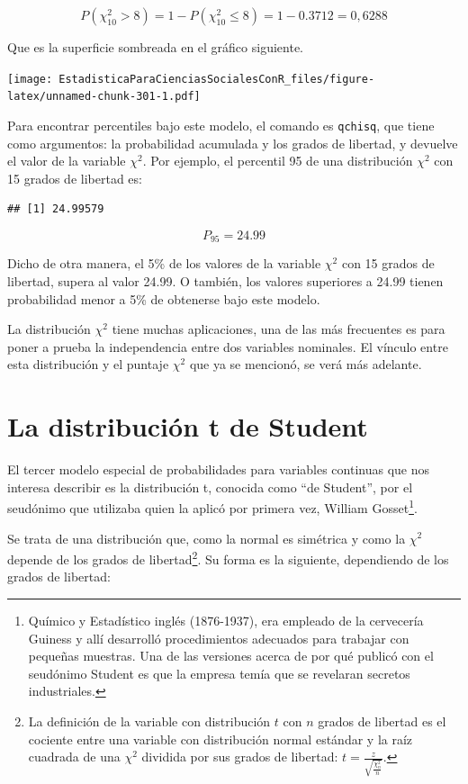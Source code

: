 \documentclass[]{book}
\let\rmarkdownfootnote\footnote%
\def\footnote{\protect\rmarkdownfootnote}
\begin{document}
\[P(\chi_{10}^{2} > 8) = 1-P(\chi_{10}^2 \leq 8)= 1-0.3712=0,6288\]

Que es la superficie sombreada en el gráfico siguiente.

\texttt{[image: EstadisticaParaCienciasSocialesConR\_files/figure-latex/unnamed-chunk-301-1.pdf]}

Para encontrar percentiles bajo este modelo, el comando es \texttt{qchisq}, que tiene como argumentos: la probabilidad acumulada y los grados de libertad, y devuelve el valor de la variable \(\chi^{2}\). Por ejemplo, el percentil 95 de una distribución \(\chi^{2}\) con 15 grados de libertad es:

\begin{verbatim}
## [1] 24.99579
\end{verbatim}

\[P_{95}=24.99\]

Dicho de otra manera, el 5\% de los valores de la variable \(\chi^{2}\) con 15 grados de libertad, supera al valor 24.99. O también, los valores superiores a 24.99 tienen probabilidad menor a 5\% de obtenerse bajo este modelo.

La distribución \(\chi^{2}\) tiene muchas aplicaciones, una de las más
frecuentes es para poner a prueba la independencia entre dos variables
nominales. El vínculo entre esta distribución y el puntaje \(\chi^{2}\)
que ya se mencionó, se verá más adelante.

\hypertarget{la-distribuciuxf3n-t-de-student}{%
\section{La distribución t de Student}\label{la-distribuciuxf3n-t-de-student}}

El tercer modelo especial de probabilidades para variables continuas que nos interesa describir es la distribución t, conocida como ``de Student'', por el seudónimo que utilizaba quien la aplicó por primera vez, William Gosset\footnote{Químico y Estadístico inglés (1876-1937), era empleado de la
  cervecería Guiness y allí desarrolló procedimientos adecuados para
  trabajar con pequeñas muestras. Una de las versiones acerca de por
  qué publicó con el seudónimo Student es que la empresa temía que se
  revelaran secretos industriales.}.

Se trata de una distribución que, como la normal es simétrica y como la
\(\chi^{2}\) depende de los grados de libertad\footnote{La definición de la variable con distribución \(t\) con \(n\) grados de
  libertad es el cociente entre una variable con distribución normal
  estándar y la raíz cuadrada de una \(\chi^{2}\) dividida por sus
  grados de libertad: \(t = \frac{z}{\sqrt{\frac{\chi_{n}^{2}}{n}}}\).}. Su forma es la
siguiente, dependiendo de los grados de libertad:
\end{document}
